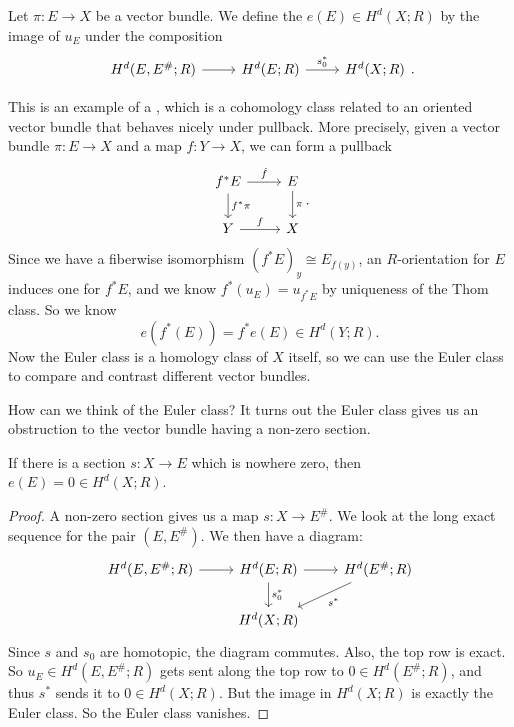 \documentclass[a4paper]{article}
\theoremstyle{definition}
\begin{document}
\begin{defi}
  Let $\pi: E \to X$ be a vector bundle. We define the  $e(E) \in H^d(X; R)$ by the image of $u_E$ under the composition
  \[
    \begin{tikzcd}
      H^d(E, E^\#; R) \ar[r] & H^d(E; R) \ar[r, "s_0^*"] & H^d(X; R)
    \end{tikzcd}.
  \]
\end{defi}
This is an example of a , which is a cohomology class related to an oriented vector bundle that behaves nicely under pullback. More precisely, given a vector bundle $\pi: E \to X$ and a map $f: Y \to X$, we can form a pullback
\[
  \begin{tikzcd}
    f^*E \ar[r, "\hat{f}"] \ar[d, "f^*\pi"] & E \ar[d, "\pi"]\\
    Y \ar[r, "f"] & X
  \end{tikzcd}.
\]
Since we have a fiberwise isomorphism $(f^*E)_y \cong E_{f(y)}$, an $R$-orientation for $E$ induces one for $f^* E$, and we know $f^*(u_E) = u_{f^* E}$ by uniqueness of the Thom class. So we know
\[
  e(f^*(E)) = f^* e(E) \in H^d(Y; R).
\]
Now the Euler class is a homology class of $X$ itself, so we can use the Euler class to compare and contrast different vector bundles.

How can we think of the Euler class? It turns out the Euler class gives us an obstruction to the vector bundle having a non-zero section.
\begin{thm}
  If there is a section $s: X \to E$ which is nowhere zero, then $e(E) = 0 \in H^d(X; R)$.
\end{thm}

\begin{proof}
  A non-zero section gives us a map $s: X \to E^\#$. We look at the long exact sequence for the pair $(E, E^\#)$. We then have a diagram:
  \[
    \begin{tikzcd}
      H^d(E, E^\#; R) \ar[r] & H^d(E; R) \ar[r] \ar[d, "s_0^*"] & H^d(E^\#; R) \ar[dl, "s^*"]\\
      & H^d(X; R)
    \end{tikzcd}
  \]
  Since $s$ and $s_0$ are homotopic, the diagram commutes. Also, the top row is exact. So $u_E \in H^d(E, E^\#; R)$ gets sent along the top row to $0 \in H^d(E^\#; R)$, and thus $s^*$ sends it to $0 \in H^d(X; R)$. But the image in $H^d(X; R)$ is exactly the Euler class. So the Euler class vanishes.
\end{proof}
\end{document}
